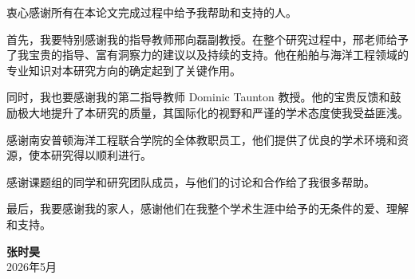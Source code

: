 
衷心感谢所有在本论文完成过程中给予我帮助和支持的人。

首先，我要特别感谢我的指导教师邢向磊副教授。在整个研究过程中，邢老师给予了我宝贵的指导、富有洞察力的建议以及持续的支持。他在船舶与海洋工程领域的专业知识对本研究方向的确定起到了关键作用。

同时，我也要感谢我的第二指导教师 Dominic Taunton 教授。他的宝贵反馈和鼓励极大地提升了本研究的质量，其国际化的视野和严谨的学术态度使我受益匪浅。

感谢南安普顿海洋工程联合学院的全体教职员工，他们提供了优良的学术环境和资源，使本研究得以顺利进行。

感谢课题组的同学和研究团队成员，与他们的讨论和合作给了我很多帮助。

最后，我要感谢我的家人，感谢他们在我整个学术生涯中给予的无条件的爱、理解和支持。

\vspace{1cm}
\begin{flushright}
\textbf{张时昊}\\
2026年5月
\end{flushright}
